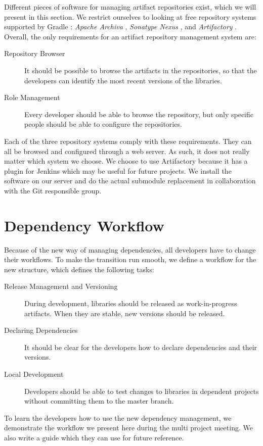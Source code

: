 Different pieces of software for managing artifact repositories exist, which we will present in this section. We restrict ourselves to looking at free repository systems supported by Gradle \parencite{gradle-dependencies-doc}: \emph{Apache Archiva} \parencite{archiva-website}, \emph{Sonatype Nexus} \parencite{nexus-website}, and \emph{Artifactory} \parencite{artifactory-website}. Overall, the only requirements for an artifact repository management system are:
\begin{description}
  \item[Repository Browser] It should be possible to browse the artifacts in the repositories, so that the developers can identify the most recent versions of the libraries.
  \item[Role Management] Every developer should be able to browse the repository, but only specific people should be able to configure the repositories.
\end{description}
Each of the three repository systems comply with these requirements. They can all be browsed and configured through a web server. As such, it does not really matter which system we choose. We choose to use Artifactory because it has a plugin for Jenkins which may be useful for future projects. We install the software on our server and do the actual submodule replacement in collaboration with the Git responsible group.

\section{Dependency Workflow}
Because of the new way of managing dependencies, all developers have to change their workflows. To make the transition run smooth, we define a workflow for the new structure, which defines the following tasks:
\begin{description}
  \item[Release Management and Versioning] During development, libraries should be released as work-in-progress artifacts. When they are stable, new versions should be released.
  \item[Declaring Dependencies] It should be clear for the developers how to declare dependencies and their versions.
  \item[Local Development] Developers should be able to test changes to libraries in dependent projects without committing them to the master branch.
\end{description}

To learn the developers how to use the new dependency management, we demonstrate the workflow we present here during the multi project meeting. We also write a guide which they can use for future reference.

